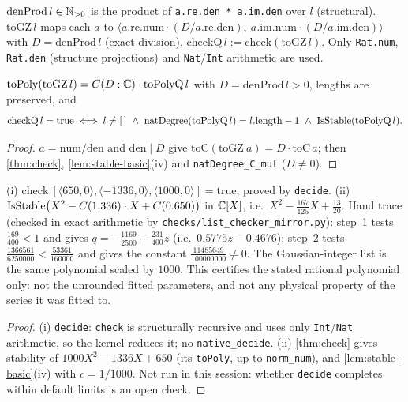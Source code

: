 \begin{definition}\label{def:checkQ}
$\mathrm{denProd}\,l\in\mathbb{N}_{>0}$ is the product of \texttt{a.re.den * a.im.den}
over $l$ (structural). $\mathrm{toGZ}\,l$ maps each $a$ to
$\langle a.\mathrm{re.num}\cdot(D/a.\mathrm{re.den}),\ a.\mathrm{im.num}\cdot(D/a.\mathrm{im.den})\rangle$
with $D=\mathrm{denProd}\,l$ (exact division). $\mathrm{checkQ}\,l:=\mathrm{check}(\mathrm{toGZ}\,l)$.
Only \texttt{Rat.num}, \texttt{Rat.den} (structure projections) and
\texttt{Nat}/\texttt{Int} arithmetic are used.
\end{definition}

\begin{theorem}\label{thm:checkQ}
$\mathrm{toPoly}(\mathrm{toGZ}\,l)=C(D:\mathbb{C})\cdot\mathrm{toPolyQ}\,l$ with
$D=\mathrm{denProd}\,l>0$, lengths are preserved, and
\[ \mathrm{checkQ}\,l=\mathrm{true}\iff l\ne[\,]\ \wedge\ \natdeg(\mathrm{toPolyQ}\,l)=l.\mathrm{length}-1\ \wedge\ \stable(\mathrm{toPolyQ}\,l). \]
\end{theorem}
\begin{proof}
$a=\mathrm{num}/\mathrm{den}$ and $\mathrm{den}\mid D$ give
$\mathrm{toC}(\mathrm{toGZ}\ a)=D\cdot\mathrm{toC}\,a$; then \ref{thm:check},
\ref{lem:stable-basic}(iv) and \texttt{natDegree\_C\_mul} ($D\ne0$).
\end{proof}

\begin{theorem}\label{thm:pilot}
(i) $\mathrm{check}\ [\langle650,0\rangle,\langle-1336,0\rangle,\langle1000,0\rangle]=\mathrm{true}$,
proved by \texttt{decide}.
(ii) $\mathrm{IsStable}\big(X^2-C(1.336)\cdot X+C(0.650)\big)$ in $\mathbb{C}[X]$, i.e.\
$X^2-\tfrac{167}{125}X+\tfrac{13}{20}$.
Hand trace (checked in exact arithmetic by
\texttt{checks/list\_checker\_mirror.py}): step~1 tests
$\tfrac{169}{400}<1$ and gives $q=-\tfrac{1169}{2500}+\tfrac{231}{400}z$
(i.e.\ $0.5775z-0.4676$); step~2 tests
$\tfrac{1366561}{6250000}<\tfrac{53361}{160000}$ and gives the constant
$\tfrac{11485649}{100000000}\ne0$. The Gaussian-integer list is the same
polynomial scaled by $1000$.
This certifies the stated rational polynomial only: not the unrounded fitted
parameters, and not any physical property of the series it was fitted to.
\end{theorem}
\begin{proof}
(i) \texttt{decide}: \texttt{check} is structurally recursive and uses only
\texttt{Int}/\texttt{Nat} arithmetic, so the kernel reduces it; no
\texttt{native\_decide}. (ii) \ref{thm:check} gives stability of
$1000X^2-1336X+650$ (its \texttt{toPoly}, up to \texttt{norm\_num}), and
\ref{lem:stable-basic}(iv) with $c=1/1000$. Not run in this session:
whether \texttt{decide} completes within default limits is an open check.
\end{proof}

